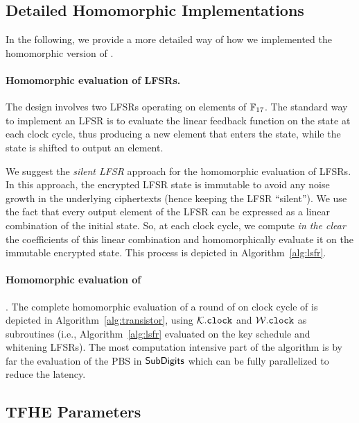 	
\subsection{Detailed Homomorphic Implementations}
\label{sec:detailed_implementation}

In the following, we provide a more detailed way of how we implemented the homomorphic version of \coolName.

\paragraph{Homomorphic evaluation of LFSRs.}
The \coolName design involves two LFSRs operating on elements of $\mathbb{F}_{17}$. The standard way to implement an LFSR is to evaluate the linear feedback function on the state at each clock cycle, thus producing a new element that enters the state, while the state is shifted to output an element. 

We suggest the \emph{silent LFSR} approach for the homomorphic evaluation of LFSRs. In this approach, the encrypted LFSR state is immutable to avoid any noise growth in the underlying ciphertexts (hence keeping the LFSR ``silent''). We use the fact that every output element of the LFSR can be expressed as a linear combination of the initial state. So, at each clock cycle, we compute \emph{in the clear} the coefficients of this linear combination and homomorphically evaluate it on the immutable encrypted state. This process is depicted in Algorithm~\ref{alg:lsfr}.





\paragraph{Homomorphic evaluation of} \coolName. The complete homomorphic evaluation of a round of on clock cycle of \coolName is depicted in Algorithm~\ref{alg:transistor}, using $\mathcal{K}.\texttt{clock}$ and $\mathcal{W}.\texttt{clock}$ as subroutines (i.e., Algorithm~\ref{alg:lsfr} evaluated on the key schedule and whitening LFSRs). The most computation intensive part of the algorithm is by far the evaluation of the PBS in $\text{\textsf{SubDigits}}$ which can be fully parallelized to reduce the latency.


 




\subsection{TFHE Parameters} 
\label{sec:tfhe-parameters}


